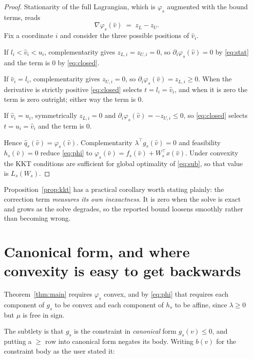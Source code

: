 \documentclass[11pt]{article}
\theoremstyle{plain}
\theoremstyle{remark}
\newcommand{\W}{W}
\newcommand{\vhat}{\hat{v}}
\newcommand{\qhat}{\hat{q}}
\begin{document}
\begin{proof}
Stationarity of the full Lagrangian, which is $\varphi_s$ augmented with the
bound terms, reads
\begin{equation}\label{eq:stat}
  \nabla \varphi_s(\vhat) \;=\; z_L - z_U .
\end{equation}
Fix a coordinate $i$ and consider the three possible positions of $\vhat_i$.

If $l_i < \vhat_i < u_i$, complementarity gives $z_{L,i} = z_{U,i} = 0$, so
$\partial_i \varphi_s(\vhat) = 0$ by \eqref{eq:stat} and the term is $0$ by
\eqref{eq:closed}.

If $\vhat_i = l_i$, complementarity gives $z_{U,i} = 0$, so
$\partial_i \varphi_s(\vhat) = z_{L,i} \ge 0$.  When the derivative is strictly
positive \eqref{eq:closed} selects $t = l_i = \vhat_i$, and when it is zero the
term is zero outright; either way the term is $0$.

If $\vhat_i = u_i$, symmetrically $z_{L,i} = 0$ and
$\partial_i \varphi_s(\vhat) = -z_{U,i} \le 0$, so \eqref{eq:closed} selects
$t = u_i = \vhat_i$ and the term is $0$.

Hence $\qhat_s(\vhat) = \varphi_s(\vhat)$.  Complementarity
$\lambda^{\top} g_s(\vhat) = 0$ and feasibility $h_s(\vhat) = 0$ reduce
\eqref{eq:phi} to $\varphi_s(\vhat) = f_s(\vhat) + \W_s^{\top} x(\vhat)$.  Under
convexity the KKT conditions are sufficient for global optimality of
\eqref{eq:sub}, so that value is $L_s(\W_s)$.
\end{proof}

Proposition~\ref{prop:kkt} has a practical corollary worth stating plainly: the
correction term \emph{measures its own inexactness}.  It is zero when the solve
is exact and grows as the solve degrades, so the reported bound loosens smoothly
rather than becoming wrong.

\section{Canonical form, and where convexity is easy to get backwards}
\label{sec:canonical}

Theorem~\ref{thm:main} requires $\varphi_s$ convex, and by \eqref{eq:phi} that
requires each component of $g_s$ to be convex and each component of $h_s$ to be
affine, since $\lambda \ge 0$ but $\mu$ is free in sign.

The subtlety is that $g_s$ is the constraint in \emph{canonical} form
$g_s(v) \le 0$, and putting a $\ge$ row into canonical form negates its body.
Writing $b(v)$ for the constraint body as the user stated it:
\end{document}
